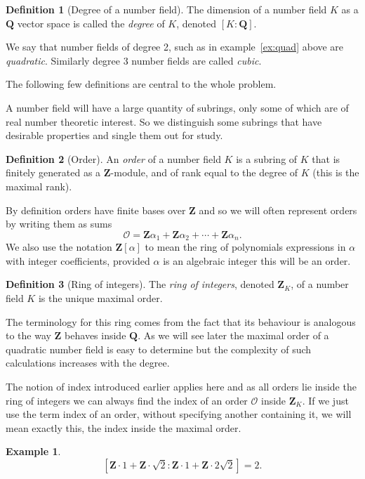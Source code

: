 \documentclass[12pt,a4paper,abstracton,bibtotoc]{scrreprt}
\theoremstyle{definition}
\newtheorem{defn}{Definition}
\newtheorem{ex}{Example}
\newcommand{\QQ}{\mathbf{Q}}
\newcommand{\ZZ}{\mathbf{Z}}
\renewcommand{\O}{\mathcal{O}}
\begin{document}
\begin{defn}[Degree of a number field]
The dimension of a number field $K$ as a $\QQ$ vector space is called the \emph{degree} of $K$, denoted $[K:\QQ]$.

We say that number fields of degree 2, such as in example~\ref{ex:quad} above are \emph{quadratic}.
Similarly degree 3 number fields are called \emph{cubic}.
\end{defn}

\minisec{}
The following few definitions are central to the whole problem.

A number field will have a large quantity of subrings, only some of which are of real number theoretic interest.
So we distinguish some subrings that have desirable properties and single them out for study.

\begin{defn}[Order]
An \emph{order} of a number field $K$ is a subring of $K$ that is finitely generated as a $\ZZ$-module, and of rank equal to the degree of $K$ (this is the maximal rank).
\end{defn}

By definition orders have finite bases over $\ZZ$ and so we will often represent orders by writing them as sums 
\[
\O = \ZZ\alpha_1 + \ZZ \alpha_2 + \cdots + \ZZ \alpha_n.
\]
We also use the notation $\ZZ[\alpha]$ to mean the ring of polynomials expressions in $\alpha$ with integer coefficients, provided $\alpha$ is an algebraic integer this will be an order.

\begin{defn}[Ring of integers]
The \emph{ring of integers}, denoted $\ZZ_K$, of a number field $K$ is the unique maximal order.
\end{defn}

The terminology for this ring comes from the fact that its behaviour is analogous to the way $\ZZ$ behaves inside $\QQ$.
As we will see later the maximal order of a quadratic number field is easy to determine but the complexity of such calculations increases with the degree.

The notion of index introduced earlier applies here and as all orders lie inside the ring of integers we can always find the index of an order $\O$ inside $\ZZ_K$.
If we just use the term index of an order, without specifying another containing it, we will mean exactly this, the index inside the maximal order.

\begin{ex}
\[
[\ZZ\cdot 1 + \ZZ\cdot \sqrt{2} : \ZZ \cdot 1 + \ZZ \cdot 2\sqrt{2}] = 2.
\]
\end{ex}
\end{document}
